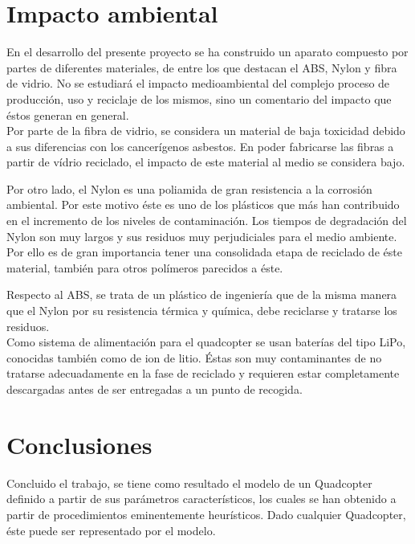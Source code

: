 \documentclass[twoside,11pt]{book}
\begin{document}
\chapter{Impacto ambiental} \label{impacto}

En el desarrollo del presente proyecto se ha construido un aparato  compuesto por partes de diferentes materiales, de entre los que destacan el ABS, Nylon y fibra de vidrio. No se estudiará el  impacto medioambiental del complejo proceso de producción, uso y reciclaje de los mismos, sino un comentario del impacto que éstos generan en general. \\

Por parte de la fibra de vidrio, se considera un material de baja toxicidad debido a sus diferencias con los cancerígenos asbestos. En poder fabricarse las fibras a partir de vídrio reciclado, el impacto de este material al medio se considera bajo.

Por otro lado, el Nylon es una poliamida de gran resistencia a la corrosión ambiental. Por este motivo éste es uno de los plásticos que más han contribuido en el incremento de los niveles de contaminación. Los tiempos de degradación del Nylon son muy largos y sus residuos muy perjudiciales para el medio ambiente. Por ello es de gran importancia tener una consolidada etapa de reciclado de éste material, también para otros polímeros parecidos a éste.

Respecto al ABS, se trata de un plástico de ingeniería que de la misma manera que el Nylon por su resistencia térmica y química, debe reciclarse y tratarse los residuos. \\

Como sistema de alimentación para el quadcopter se usan baterías del tipo LiPo, conocidas también como de ion de litio. Éstas son muy contaminantes de no tratarse adecuadamente en la fase de reciclado y requieren estar completamente descargadas antes de ser entregadas a un punto de recogida.

\newpage

\chapter{Conclusiones} \label{conclusiones}

Concluido el trabajo, se tiene como resultado el modelo de un Quadcopter definido a partir de sus parámetros característicos, los cuales se han obtenido a partir de procedimientos eminentemente heurísticos. Dado cualquier Quadcopter, éste puede ser representado por el modelo.
\end{document}
